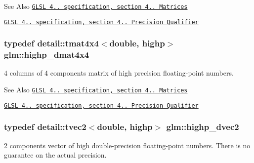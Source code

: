 \begin{DoxySeeAlso}{See Also}
\href{http://www.opengl.org/registry/doc/GLSLangSpec.4.20.8.pdf}{\tt G\-L\-S\-L 4.. specification, section 4.. Matrices} 

\href{http://www.opengl.org/registry/doc/GLSLangSpec.4.20.8.pdf}{\tt G\-L\-S\-L 4.. specification, section 4.. Precision Qualifier} 
\end{DoxySeeAlso}
\hypertarget{group__core__precision_ga1c0a2edbde597b59e9005691a224b208}{
\subsubsection[{highp\-\_\-dmat4x4}]{\setlength{\rightskip}{0pt plus 5cm}typedef detail\-::tmat4x4$<$double, highp$>$ {\bf glm\-::highp\-\_\-dmat4x4}}}\label{group__core__precision_ga1c0a2edbde597b59e9005691a224b208}
4 columns of 4 components matrix of high precision floating-\/point numbers.

\begin{DoxySeeAlso}{See Also}
\href{http://www.opengl.org/registry/doc/GLSLangSpec.4.20.8.pdf}{\tt G\-L\-S\-L 4.. specification, section 4.. Matrices} 

\href{http://www.opengl.org/registry/doc/GLSLangSpec.4.20.8.pdf}{\tt G\-L\-S\-L 4.. specification, section 4.. Precision Qualifier} 
\end{DoxySeeAlso}
\hypertarget{group__core__precision_gacfbe8512142fff27f0bfb44958c1752f}{
\subsubsection[{highp\-\_\-dvec2}]{\setlength{\rightskip}{0pt plus 5cm}typedef detail\-::tvec2$<$double, highp$>$ {\bf glm\-::highp\-\_\-dvec2}}}\label{group__core__precision_gacfbe8512142fff27f0bfb44958c1752f}
2 components vector of high double-\/precision floating-\/point numbers. There is no guarantee on the actual precision.

